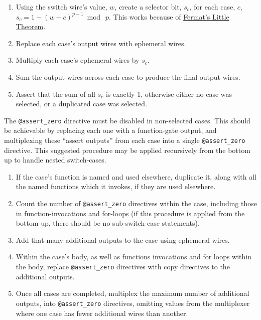 \begin{enumerate}
    \item Using the switch wire's value, $w$, create a selector bit, $s_c$, for each case, $c$, $s_c = 1 - (w-c)^{p-1} \bmod\ p$.
    This works because of \href{https://en.wikipedia.org/wiki/Fermat%27s_little_theorem}{Fermat's Little Theorem}.
    \item Replace each case's output wires with ephemeral wires.
    \item Multiply each case's ephemeral wires by $s_c$.
    \item Sum the output wires across each case to produce the final output wires.
    \item Assert that the sum of all $s_c$ is exactly 1, otherwise either no case was selected, or a duplicated case was selected.
\end{enumerate}

The \texttt{@assert\_zero} directive must be disabled in non-selected cases.
This should be achievable by replacing each one with a function-gate output, and multiplexing these ``assert outputs'' from each case into a single \texttt{@assert\_zero} directive.
This suggested procedure may be applied recursively from the bottom up to handle nested switch-cases.\\

\begin{enumerate}
    \item If the case's function is named and used elsewhere, duplicate it, along with all the named functions which it invokes, if they are used elsewhere.
    \item Count the number of \texttt{@assert\_zero} directives within the case, including those in function-invocations and for-loops (if this procedure is applied from the bottom up, there should be no sub-switch-case statements).
    \item Add that many additional outputs to the case using ephemeral wires.
    \item Within the case's body, as well as functions invocations and for loops within the body, replace \texttt{@assert\_zero} directives with copy directives to the additional outputs.
    \item Once all cases are completed, multiplex the maximum number of additional outputs, into \texttt{@assert\_zero} directives, omitting values from the multiplexer where one case has fewer additional wires than another.
\end{enumerate}

